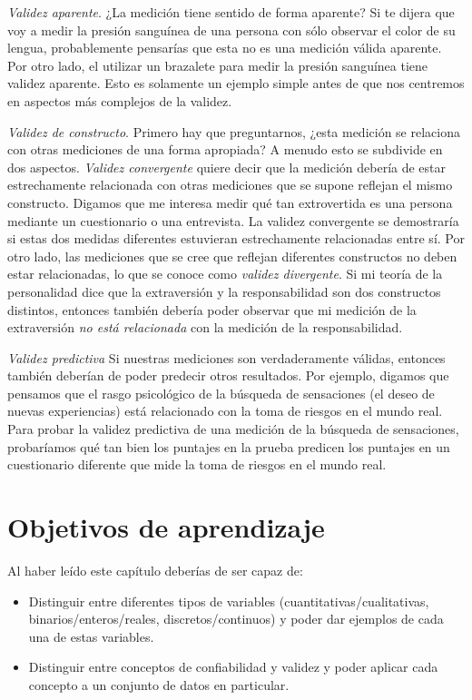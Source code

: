 \documentclass[
  12pt,
]{book}
\providecommand{\tightlist}{%
  \setlength{\itemsep}{0pt}\setlength{\parskip}{0pt}}
\begin{document}
\emph{Validez aparente}. ¿La medición tiene sentido de forma aparente? Si te dijera que voy a medir la presión sanguínea de una persona con sólo observar el color de su lengua, probablemente pensarías que esta no es una medición válida aparente. Por otro lado, el utilizar un brazalete para medir la presión sanguínea tiene validez aparente. Esto es solamente un ejemplo simple antes de que nos centremos en aspectos más complejos de la validez.

\emph{Validez de constructo}. Primero hay que preguntarnos, ¿esta medición se relaciona con otras mediciones de una forma apropiada? A menudo esto se subdivide en dos aspectos. \emph{Validez convergente} quiere decir que la medición debería de estar estrechamente relacionada con otras mediciones que se supone reflejan el mismo constructo. Digamos que me interesa medir qué tan extrovertida es una persona mediante un cuestionario o una entrevista. La validez convergente se demostraría si estas dos medidas diferentes estuvieran estrechamente relacionadas entre sí. Por otro lado, las mediciones que se cree que reflejan diferentes constructos no deben estar relacionadas, lo que se conoce como \emph{validez divergente}. Si mi teoría de la personalidad dice que la extraversión y la responsabilidad son dos constructos distintos, entonces también debería poder observar que mi medición de la extraversión \emph{no está relacionada} con la medición de la responsabilidad.

\emph{Validez predictiva} Si nuestras mediciones son verdaderamente válidas, entonces también deberían de poder predecir otros resultados. Por ejemplo, digamos que pensamos que el rasgo psicológico de la búsqueda de sensaciones (el deseo de nuevas experiencias) está relacionado con la toma de riesgos en el mundo real. Para probar la validez predictiva de una medición de la búsqueda de sensaciones, probaríamos qué tan bien los puntajes en la prueba predicen los puntajes en un cuestionario diferente que mide la toma de riesgos en el mundo real.

\hypertarget{objetivos-de-aprendizaje}{%
\section{Objetivos de aprendizaje}\label{objetivos-de-aprendizaje}}

Al haber leído este capítulo deberías de ser capaz de:

\begin{itemize}
\tightlist
\item
  Distinguir entre diferentes tipos de variables (cuantitativas/cualitativas, binarios/enteros/reales, discretos/continuos) y poder dar ejemplos de cada una de estas variables.
\item
  Distinguir entre conceptos de confiabilidad y validez y poder aplicar cada concepto a un conjunto de datos en particular.
\end{itemize}
\end{document}

